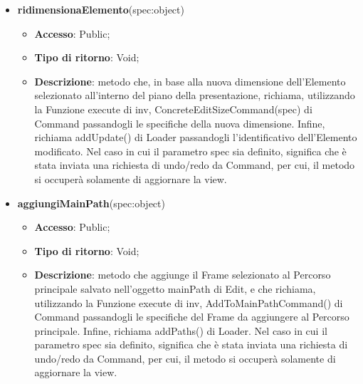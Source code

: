 {{\begin{itemize}
\begin{itemize}
				\item \textbf{Tipo di ritorno}: Void;
				\item \textbf{Descrizione}: metodo che, in base al nuovo posizionamento dell'Elemento selezionato all'interno del piano della presentazione, richiama, utilizzando la Funzione execute di inv, ConcreteEditPositionCommand() di Command passandogli le specifiche della nuova posizione. Infine, richiama addUpdate() di Loader passandogli l'identificativo dell'Elemento modificato. Nel caso in cui il parametro spec sia definito, significa che è stata inviata una richiesta di undo/redo da Command, per cui, il metodo si occuperà solamente di aggiornare la view.
			\end{itemize}
			\item \textbf{ridimensionaElemento}(spec:object)
			\begin{itemize}
				\item \textbf{Accesso}: Public;
				\item \textbf{Tipo di ritorno}: Void;
				\item \textbf{Descrizione}: metodo che, in base alla nuova dimensione dell'Elemento selezionato all'interno del piano della presentazione, richiama, utilizzando la Funzione execute di inv, ConcreteEditSizeCommand(spec) di Command passandogli le specifiche della nuova dimensione. Infine, richiama addUpdate() di Loader passandogli l'identificativo dell'Elemento modificato. Nel caso in cui il parametro spec sia definito, significa che è stata inviata una richiesta di undo/redo da Command, per cui, il metodo si occuperà solamente di aggiornare la view.
			\end{itemize}
			\item \textbf{aggiungiMainPath}(spec:object)
			\begin{itemize}
				\item \textbf{Accesso}: Public;
				\item \textbf{Tipo di ritorno}: Void;
				\item \textbf{Descrizione}: metodo che aggiunge il Frame selezionato al Percorso principale salvato nell'oggetto mainPath di Edit, e che richiama, utilizzando la Funzione execute di inv, AddToMainPathCommand() di Command passandogli le specifiche del Frame da aggiungere al Percorso principale. Infine, richiama addPaths() di Loader. Nel caso in cui il parametro spec sia definito, significa che è stata inviata una richiesta di undo/redo da Command, per cui, il metodo si occuperà solamente di aggiornare la view.

\end{itemize}
\end{itemize}}}

